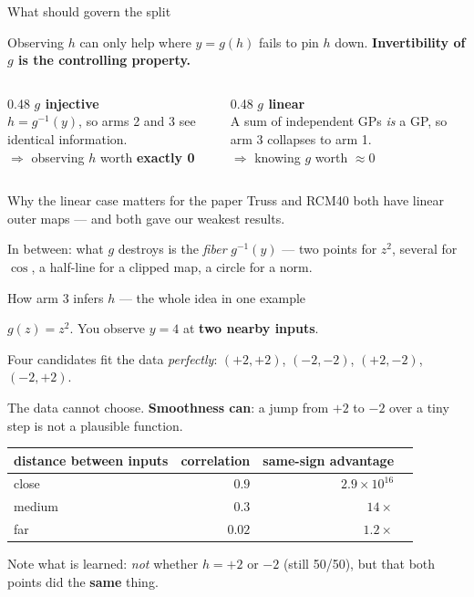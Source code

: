 \documentclass[aspectratio=169,11pt]{beamer}
\begin{document}
\begin{frame}{What should govern the split}

Observing $h$ can only help where $y=g(h)$ fails to pin $h$ down.
\textbf{Invertibility of $g$ is the controlling property.}

\bigskip
\begin{columns}[T]
\begin{column}{0.48\textwidth}
\textbf{$g$ injective}\\[2pt]
$h=g^{-1}(y)$, so arms 2 and 3 see identical information.\\[4pt]
$\Rightarrow$ observing $h$ worth \textbf{exactly 0}
\end{column}
\begin{column}{0.48\textwidth}
\textbf{$g$ linear}\\[2pt]
A sum of independent GPs \emph{is} a GP, so arm 3 collapses to arm 1.\\[4pt]
$\Rightarrow$ knowing $g$ worth \textbf{$\approx 0$}
\end{column}
\end{columns}

\bigskip
\begin{block}{Why the linear case matters for the paper}
Truss and RCM40 both have linear outer maps --- and both gave our weakest
results.
\end{block}

\bigskip
In between: what $g$ destroys is the \emph{fiber} $g^{-1}(y)$ --- two points for
$z^2$, several for $\cos$, a half-line for a clipped map, a circle for a norm.

\end{frame}

\begin{frame}{How arm 3 infers $h$ --- the whole idea in one example}

$g(z)=z^2$. You observe $y=4$ at \textbf{two nearby inputs}.

\medskip
Four candidates fit the data \emph{perfectly}:
$(+2,+2)$, $(-2,-2)$, $(+2,-2)$, $(-2,+2)$.

\medskip
The data cannot choose. \textbf{Smoothness can}: a jump from $+2$ to $-2$ over a
tiny step is not a plausible function.

\bigskip
\begin{center}
\begin{tabular}{lrrr}
\toprule
distance between inputs & correlation & same-sign advantage \\
\midrule
close   & $0.9$  & $2.9\times10^{16}$ \\
medium  & $0.3$  & $14\times$ \\
far     & $0.02$ & $1.2\times$ \\
\bottomrule
\end{tabular}
\end{center}

\bigskip
Note what is learned: \emph{not} whether $h=+2$ or $-2$ (still 50/50), but that
both points did the \textbf{same} thing.

\end{frame}
\end{document}
